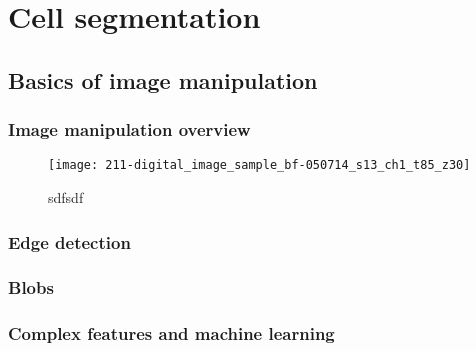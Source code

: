 
\chapter{Cell segmentation}

\ifpdf
    \graphicspath{{Chapter2/Figs/Raster/}{Chapter2/Figs/PDF/}{Chapter2/Figs/}}
\else
    \graphicspath{{Chapter2/Figs/Vector/}{Chapter2/Figs/}}
\fi

\section{Basics of image manipulation}

\subsection{Image manipulation overview}

\begin{figure}[htbp!]
\centering
\texttt{[image: 211-digital\_image\_sample\_bf-050714\_s13\_ch1\_t85\_z30]}
\caption[sfs]{sdfsdf}
\label{fig:digital_image_sample_bf}
\end{figure}

\subsection{Edge detection}


\subsection{Blobs}


\subsection{Complex features and machine learning}

